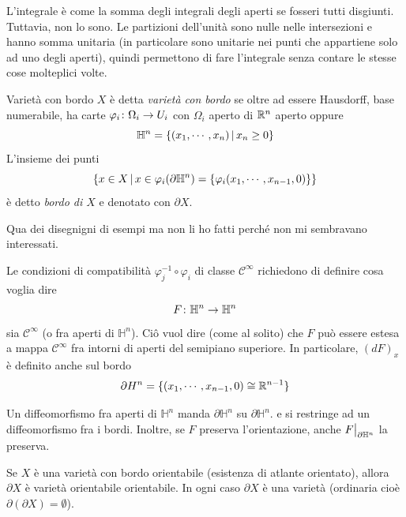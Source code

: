 \documentclass[a4paper]{article}
\begin{document}
L'integrale è come la somma degli integrali degli aperti se fosseri tutti disgiunti.
Tuttavia, non lo sono. Le partizioni dell'unità sono nulle nelle intersezioni e hanno somma unitaria (in particolare sono unitarie nei punti che appartiene solo ad uno degli aperti),
quindi permettono di fare l'integrale senza contare le stesse cose molteplici volte.

\begin{snippetdefinition}{Varietà con bordo}
    \(X\) è detta \emph{varietà con bordo}
    se oltre ad essere Hausdorff, base numerabile, ha carte \(\varphi_i \colon \Omega_i \to U_i\)
    con \(\Omega_i\) aperto di \(\mathbb{R}^n\) aperto oppure \[
        \mathbb H^n = \{(x_1, \cdots, x_n) \,|\, x_n \geq 0\}
    \]
    L'insieme dei punti \[
        \{x \in X \,|\, x \in \varphi_i(\partial \mathbb H^n) = \left\{
            \varphi_i(x_1, \cdots, x_{n-1}, 0)
        \right\} \}
    \]
    è detto \emph{bordo di \(X\)} e denotato con \(\partial X\).
\end{snippetdefinition}

Qua dei disegnigni di esempi ma non li ho fatti perché non mi sembravano interessati.

Le condizioni di compatibilità \(\varphi_j^{-1} \circ \varphi_i\)
di classe \(\mathcal C^\infty\) richiedono di definire cosa voglia dire
\[
    F \colon \mathbb H^n \to \mathbb H^n
\]
sia \(\mathcal C^\infty\) (o fra aperti di \(\mathbb H^n\)).
Ciô vuol dire (come al solito) che \(F\) può essere estesa a mappa \(\mathcal C^\infty\)
fra intorni di aperti del semipiano superiore.
In particolare, \(\left(d F\right)_x\) è definito anche sul bordo \[
    \partial H^n = \{(x_1, \cdots, x_{n-1}, 0) \cong \mathbb{R}^{n-1}\}
\]

\begin{snippetlemma}{}
    Un diffeomorfismo fra aperti di \(\mathbb H^n\)
    manda \(\partial \mathbb H^n\) su \(\partial \mathbb H^n\). e si restringe ad un diffeomorfismo
    fra i bordi. Inoltre,
    se \(F\) preserva l'orientazione, anche
    \(\restr{F}{\partial \mathbb H^n}\) la preserva.
\end{snippetlemma}

\begin{snippetcorollary}{}
    Se \(X\) è una varietà con bordo orientabile (esistenza di atlante orientato),
    allora \(\partial X\) è varietà orientabile orientabile. In ogni caso \(\partial X\)
    è una varietà (ordinaria cioè \(\partial(\partial X) = \emptyset\)).
\end{snippetcorollary}
\end{document}
